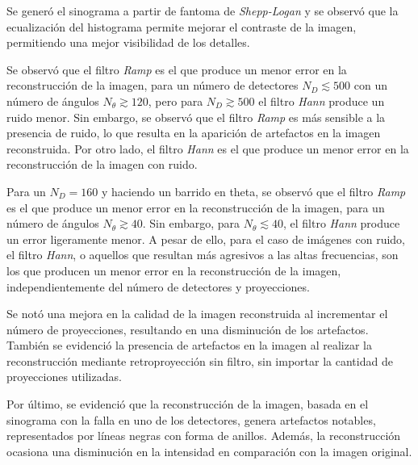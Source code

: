 \documentclass[11pt, twocolumn]{article}
\begin{document}
Se generó el sinograma a partir de fantoma de \textit{Shepp-Logan} y se observó que la ecualización del histograma permite mejorar el contraste de la imagen, permitiendo una mejor visibilidad de los detalles.

Se observó que el filtro \textit{Ramp} es el que produce un menor error en la reconstrucción de la imagen, para un número de detectores $N_D \lesssim 500$ con un número de ángulos $N_\theta \gtrsim 120$, pero para $N_D \gtrsim 500$ el filtro \textit{Hann} produce un ruido menor. Sin embargo, se observó que el filtro \textit{Ramp} es más sensible a la presencia de ruido, lo que resulta en la aparición de artefactos en la imagen reconstruida. Por otro lado, el filtro \textit{Hann} es el que produce un menor error en la reconstrucción de la imagen con ruido.

Para un $N_D = 160$ y haciendo un barrido en theta, se observó que el filtro \textit{Ramp} es el que produce un menor error en la reconstrucción de la imagen, para un número de ángulos $N_\theta \gtrsim 40$. Sin embargo, para $N_\theta \lesssim 40$, el filtro \textit{Hann} produce un error ligeramente menor. A pesar de ello, para el caso de imágenes con ruido, el filtro \textit{Hann}, o aquellos que resultan más agresivos a las altas frecuencias, son los que producen un menor error en la reconstrucción de la imagen, independientemente del número de detectores y proyecciones.

Se notó una mejora en la calidad de la imagen reconstruida al incrementar el número de proyecciones, resultando en una disminución de los artefactos. También se evidenció la presencia de artefactos en la imagen al realizar la reconstrucción mediante retroproyección sin filtro, sin importar la cantidad de proyecciones utilizadas.

Por último, se evidenció que la reconstrucción de la imagen, basada en el sinograma con la falla en uno de los detectores, genera artefactos notables, representados por líneas negras con forma de anillos. Además, la reconstrucción ocasiona una disminución en la intensidad en comparación con la imagen original.
\end{document}
